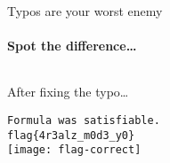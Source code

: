\begin{frame}{Typos are your worst enemy}
    \framesubtitle{Spot the difference\ldots}
    \begin{columns}
    \end{columns}
\end{frame}

\begin{frame}{After fixing the typo\ldots}
    \begin{center}
        {\Large
            \texttt{Formula was satisfiable.} \\
            \texttt{flag\{4r3alz\_m0d3\_y0\}} \\
        }
        \pause \vspace{0.5in}
        \texttt{[image: flag-correct]}
    \end{center}
\end{frame}

\begin{comment}
\begin{frame}{Irreversible transforms and hash functions}
    \framesubtitle{It's only sort of magic}
    \begin{itemize}
        \item<1-> Hash functions are usually defined as
                  $H(s, x) \rightarrow \{0, 1\}^\ell$, where $s$ is the 'seed',
                  $x$ is the message, and $\ell$ is some fixed number of bits
        \item<2-> The 'seed' is some public value used to initialize the hash
                  function's state
        \item<3-> There are a series of repeated 'reductions' meant to take the
                  message and perform some sort of irreversible transform on it
                  one block at a time
    \end{itemize}
    \begin{block}<4->{Example}
        For SHA256, $s$ is the fractional part of the cube roots of the first
        64 primes, $\ell = 256$, and the reductions involve a few non-linear
        functions (i.e. addition/XOR of multiple values, taking the majority of
        three bits, etc). The idea is that {\em you can't get the original
        message back once you start scrambling it.}
    \end{block}
\end{frame}
\end{comment}
